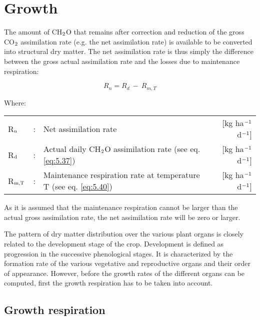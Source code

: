 \section{Growth}

The amount of CH$_{{\rm 2}}$O that remains after correction and reduction of the gross CO$_{{\rm 2}}$ assimilation rate (e.g. the net assimilation rate) is available to be converted into structural dry matter.  The net assimilation rate is thus simply the difference between the gross actual assimilation rate and the losses due to maintenance respiration:

\begin{equation}
    \label{eq:5.41}
	R_{n} = R_{d} ~-~ R _{m,T} 
\end{equation}

Where:\\[5pt]
\begin{tabularx}{\textwidth}{llXr}
	R$_{{\rm n}}$ &:& Net assimilation rate   &     [kg ha$^{{\rm -1}}$ d$^{{\rm -1}}$]\\
	R$_{{\rm d}}$ &:& Actual daily CH$_{{\rm 2}}$O assimilation rate (see eq. \ref{eq:5.37})   &   
	[kg ha$^{{\rm -1}}$ d$^{{\rm -1}}$]\\
	R$_{{\rm m,T}}$ &:& Maintenance respiration rate at 
	temperature T (see eq. \ref{eq:5.40})   &     [kg ha$^{{\rm -1}}$ d$^{{\rm -1}}$]\\
\end{tabularx}

As it is assumed that the maintenance respiration cannot be larger than the actual gross 
assimilation rate, the net assimilation rate will be zero or larger.

The pattern of dry matter distribution over the various plant organs is closely related to
the development stage of the crop. Development is defined as progression in the successive 
phenological stages. It is characterized by the formation rate of the various vegetative
and reproductive organs and their order of appearance. However, before the growth rates
of the different organs can be computed, first the growth respiration has to be taken into account.

\subsection{Growth respiration}

